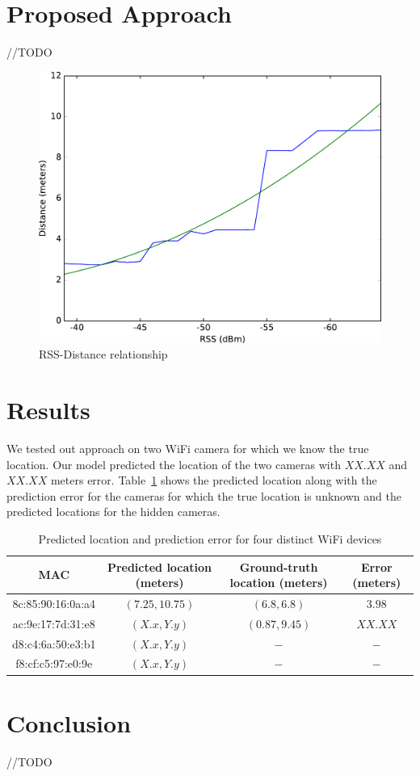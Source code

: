 \documentclass{article}
\begin{document}
\section{Proposed Approach}
\vspace{-.3cm}
//TODO
\begin{figure}
    \centering
    \vspace{-18pt}
    \includegraphics[width=\linewidth]{figures/rss_distance_plot.pdf}
    \caption{RSS-Distance relationship \label{fig:rss_distance_plot}}
\end{figure}


\section{Results}
\vspace{-.3cm}
We tested out approach on two WiFi camera for which we know the true location. Our
model predicted the location of the two cameras with $XX.XX$ and $XX.XX$ meters error.
Table~\ref{tab:results} shows the predicted location along with the prediction error for the
cameras for which the true location is unknown and the predicted locations for the hidden cameras.

\begin{center}
\begin{table}[h]
\centering
\begin{tabular}{ |c|c|c|c| } 
 \hline
 MAC & Predicted location (meters) & Ground-truth location (meters) & Error (meters) \\ 
 \hline
 8c:85:90:16:0a:a4 & $(7.25, 10.75)$ & $(6.8, 6.8)$ & $3.98$\\ 
 ac:9e:17:7d:31:e8 & $(X.x, Y.y)$ & $(0.87, 9.45)$ & $XX.XX$ \\ 
 d8:c4:6a:50:e3:b1 & $(X.x, Y.y)$ & $-$ & $-$ \\
 f8:cf:c5:97:e0:9e & $(X.x, Y.y)$ & $-$ & $-$ \\
 \hline
\end{tabular}
 \caption{Predicted location and prediction error for four distinct WiFi devices \label{tab:results}}
\end{table}
\end{center}




\section{Conclusion}
\vspace{-.3cm}
//TODO


{\scriptsize%

}
\end{document}
